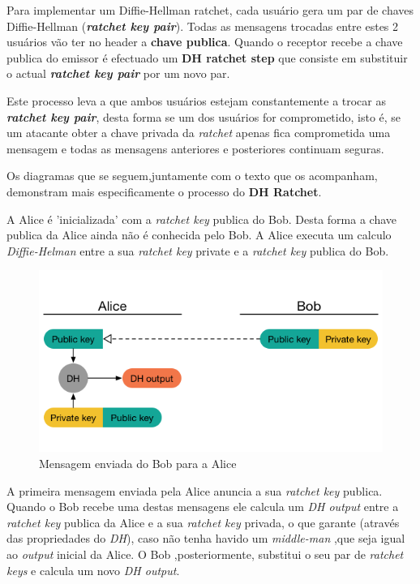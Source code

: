 Para implementar um Diffie-Hellman ratchet, cada usuário gera um par de chaves Diffie-Hellman (\textit{\textbf{ratchet key pair}}). Todas as mensagens trocadas entre estes 2 usuários vão ter no header a \textbf{chave publica}. Quando o receptor recebe a chave publica do emissor é efectuado um \textbf{DH ratchet step} que consiste em substituir o actual \textbf{\textit{ratchet key pair}} por um novo par.

Este processo leva a que ambos usuários estejam constantemente a trocar as \textbf{\textit{ratchet key pair}}, desta forma se um dos usuários for comprometido, isto é, se um atacante obter a chave privada da \textit{ratchet} apenas fica comprometida uma mensagem e todas as mensagens anteriores e posteriores continuam seguras.

Os diagramas que se seguem,juntamente com o texto que os acompanham, demonstram mais especificamente o processo do \textbf{DH Ratchet}.


A Alice é 'inicializada' com a \textit{ratchet key} publica do Bob. Desta forma a chave publica da Alice ainda não é conhecida pelo Bob. A Alice executa um calculo \textit{Diffie-Helman} entre a sua \textit{ratchet key} private e a \textit{ratchet key} publica do Bob.

\begin{figure}[H]
\begin{center}
\includegraphics[width=12cm]{img/DH1.png}
\caption{Mensagem enviada do Bob para a Alice}
\label{diagram:DH1}
\centering
\end{center}
\end{figure}

A primeira mensagem enviada pela Alice anuncia a sua \textit{ratchet key} publica. Quando o Bob recebe uma destas mensagens ele calcula um \textit{DH output} entre a \textit{ratchet key} publica da Alice e a sua \textit{ratchet key} privada, o que garante (através das propriedades do \textit{DH}), caso não tenha havido um \textit{middle-man} ,que seja igual ao \textit{output} inicial da Alice. O Bob ,posteriormente, substitui o seu par de \textit{ratchet keys} e calcula um novo \textit{DH output}.

